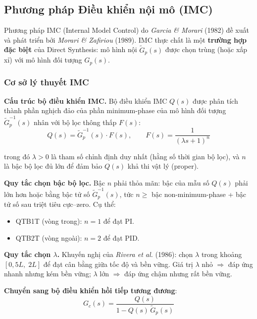 \documentclass[../main.tex]{subfiles}
\begin{document}
\subsection{Phương pháp Điều khiển nội mô (IMC)}

Phương pháp IMC (Internal Model Control) do \textit{Garcia \& Morari} (1982) đề xuất và phát triển bởi \textit{Morari \& Zafiriou} (1989). IMC thực chất là một \textbf{trường hợp đặc biệt} của Direct Synthesis: mô hình nội $\tilde{G}_p(s)$ được chọn trùng (hoặc xấp xỉ) với mô hình đối tượng $G_p(s)$.

\subsubsection{Cơ sở lý thuyết IMC}

\textbf{Cấu trúc bộ điều khiển IMC.} Bộ điều khiển IMC $Q(s)$ được phân tích thành phần nghịch đảo của phần minimum-phase của mô hình đối tượng $\tilde{G}_p^{-1}(s)$ nhân với bộ lọc thông thấp $F(s)$:
\begin{equation}
    Q(s) = \tilde{G}_p^{-1}(s) \cdot F(s), \qquad F(s) = \frac{1}{(\lambda s + 1)^n}
    \label{eq:imc_structure}
\end{equation}

trong đó $\lambda > 0$ là tham số chỉnh định duy nhất (hằng số thời gian bộ lọc), và $n$ là bậc bộ lọc đủ lớn để đảm bảo $Q(s)$ khả thi vật lý (proper).

\textbf{Quy tắc chọn bậc bộ lọc.} Bậc $n$ phải thỏa mãn: bậc của mẫu số $Q(s)$ phải lớn hơn hoặc bằng bậc tử số $\tilde{G}_p^{-1}(s)$, tức $n \geq$ bậc non-minimum-phase + bậc tử số sau triệt tiêu cực--zero. Cụ thể:
\begin{itemize}
    \item QTB1T (vòng trong): $n = 1$ để đạt PI.
    \item QTB2T (vòng ngoài): $n = 2$ để đạt PID.
\end{itemize}

\textbf{Quy tắc chọn $\lambda$.} Khuyến nghị của \textit{Rivera et al.} (1986): chọn $\lambda$ trong khoảng $[0{,}5L,\; 2L]$ để đạt cân bằng giữa tốc độ và bền vững. Giá trị $\lambda$ nhỏ $\Rightarrow$ đáp ứng nhanh nhưng kém bền vững; $\lambda$ lớn $\Rightarrow$ đáp ứng chậm nhưng rất bền vững.

\textbf{Chuyển sang bộ điều khiển hồi tiếp tương đương}:
\begin{equation}
    G_c(s) = \frac{Q(s)}{1 - Q(s)\,\tilde{G}_p(s)}
    \label{eq:imc_to_feedback}
\end{equation}
\end{document}
